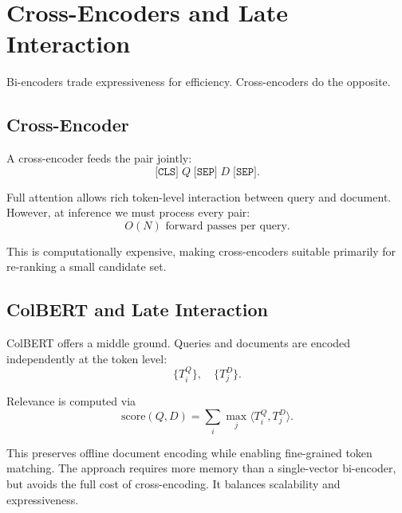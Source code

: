 \section{Cross-Encoders and Late Interaction}
\medskip

Bi-encoders trade expressiveness for efficiency. Cross-encoders do the opposite.

\bigskip
\subsection{Cross-Encoder}
\medskip

A cross-encoder feeds the pair jointly:
\[
\texttt{[CLS]} \; Q \; \texttt{[SEP]} \; D \; \texttt{[SEP]}.
\]

Full attention allows rich token-level interaction between query and document. However, at inference we must process every pair:
\[
O(N) \text{ forward passes per query.}
\]

This is computationally expensive, making cross-encoders suitable primarily for re-ranking a small candidate set.

\bigskip
\subsection{ColBERT and Late Interaction}
\medskip

ColBERT offers a middle ground. Queries and documents are encoded independently at the token level:
\[
\{T_i^Q\}, \quad \{T_j^D\}.
\]

Relevance is computed via
\[
\text{score}(Q, D)
=
\sum_i
\max_{j}
\langle T_i^Q, T_j^D \rangle.
\]

This preserves offline document encoding while enabling fine-grained token matching. The approach requires more memory than a single-vector bi-encoder, but avoids the full cost of cross-encoding. It balances scalability and expressiveness.


\bigskip

